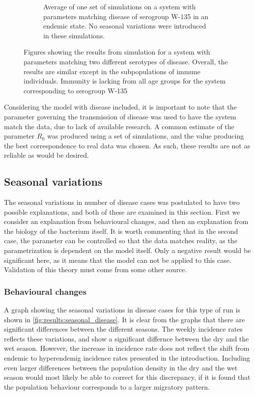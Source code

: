 \documentclass[10pt,a4paper]{article}
\begin{document}
\begin{figure}[h]
\begin{subfigure}{0.45\textwidth}
		\caption{Average of one set of simulations on a system with parameters matching disease of serogroup W-135 in an endemic state. No seasonal variations were introduced in these simulations.} \label{fig:results:endemic_disease_W135}
	\end{subfigure}
	\caption{Figures showing the results from simulation for a system with parameters matching two different serotypes of disease. Overall, the results are similar except in the subpopulations of immune individuals. Immunity is lacking from all age groups for the system corresponding to serogroup W-135} \label{fig:results:endemic_disease}
\end{figure}

Considering the model with disease included, it is important to note that the parameter governing the transmission of disease was used to have the system match the data, due to lack of available research. A common estimate of the parameter $R_0$ was produced using a set of simulations, and the value producing the best correspondence to real data was chosen. As such, these results are not as reliable as would be desired.



\subsection{Seasonal variations}

The seasonal variations in number of disease cases was postulated to have two possible explanations, and both of these are examined in this section. First we consider an explanation from behavioural changes, and then an explanation from the biology of the bacterium itself. It is worth commenting that in the second case, the parameter can be controlled so that the data matches reality, as the parametrization is dependent on the model itself. Only a negative result would be significant here, as it means that the model can not be applied to this case. Validation of this theory must come from some other source.

\subsubsection{Behavioural changes}

A graph showing the seasonal variations in disease cases for this type of run is shown in \cref{fig:results:seasonal_disease}. It is clear from the graphs that there are significant differences between the different seasons. The weekly incidence rates reflects these variations, and show a significant differnce between the dry and the wet season. However, the increase in incidence rate does not reflect the shift from endemic to hyperendemig incidence rates presented in the introduction. Including even larger differences between the population density in the dry and the wet season would most likely be able to correct for this discrepancy, if it is found that the population behaviour corresponds to a larger migratory pattern.
\end{document}
